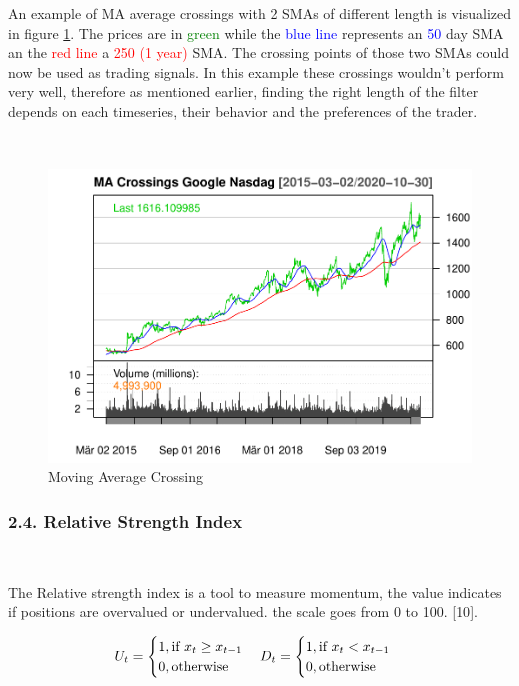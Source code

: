 \documentclass[
]{article}
\begin{document}
\newpage

An example of MA average crossings with 2 SMAs of different length is
visualized in figure \ref{fig:chap2.3.3}. The prices are in
\textcolor{green}{green} while the \textcolor{blue}{blue line}
represents an \textcolor{blue}{50} day SMA an the
\textcolor{red}{red line} a \textcolor{red}{250 (1 year)} SMA. The
crossing points of those two SMAs could now be used as trading signals.
In this example these crossings wouldn't perform very well, therefore as
mentioned earlier, finding the right length of the filter depends on
each timeseries, their behavior and the preferences of the trader.

~

\begin{figure}

{\centering \includegraphics[width=0.7\linewidth]{00_main_files/figure-latex/chap2.3.3-1} 

}

\caption{Moving Average Crossing}\label{fig:chap2.3.3}
\end{figure}

\newpage

\hypertarget{relative-strength-index}{%
\subsubsection{2.4. Relative Strength
Index}\label{relative-strength-index}}

~

The Relative strength index is a tool to measure momentum, the value
indicates if positions are overvalued or undervalued. the scale goes
from 0 to 100. {[}10{]}.

\begin{equation}
  \label{eq:mac1}
  U_{t}=\begin{cases}1, \textnormal{if }    x_t \ge x_{t-1}\\0, \textnormal{otherwise} \end{cases}
  D_{t}=\begin{cases}1, \textnormal{if }  x_t < x_{t-1}\\0, \textnormal{otherwise} \end{cases}
\end{equation}
\end{document}
